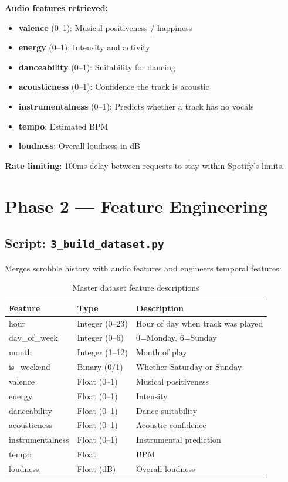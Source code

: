 \documentclass[12pt, a4paper]{article}
\begin{document}
\textbf{Audio features retrieved:}
\begin{itemize}
    \item \textbf{valence} (0--1): Musical positiveness / happiness
    \item \textbf{energy} (0--1): Intensity and activity
    \item \textbf{danceability} (0--1): Suitability for dancing
    \item \textbf{acousticness} (0--1): Confidence the track is acoustic
    \item \textbf{instrumentalness} (0--1): Predicts whether a track has no vocals
    \item \textbf{tempo}: Estimated BPM
    \item \textbf{loudness}: Overall loudness in dB
\end{itemize}

\textbf{Rate limiting}: 100ms delay between requests to stay within Spotify's limits.

\section{Phase 2 — Feature Engineering}

\subsection{Script: \texttt{3\_build\_dataset.py}}

Merges scrobble history with audio features and engineers temporal features:

\begin{table}[H]
\centering
\begin{tabular}{lll}
\toprule
\textbf{Feature} & \textbf{Type} & \textbf{Description} \\
\midrule
hour & Integer (0--23) & Hour of day when track was played \\
day\_of\_week & Integer (0--6) & 0=Monday, 6=Sunday \\
month & Integer (1--12) & Month of play \\
is\_weekend & Binary (0/1) & Whether Saturday or Sunday \\
valence & Float (0--1) & Musical positiveness \\
energy & Float (0--1) & Intensity \\
danceability & Float (0--1) & Dance suitability \\
acousticness & Float (0--1) & Acoustic confidence \\
instrumentalness & Float (0--1) & Instrumental prediction \\
tempo & Float & BPM \\
loudness & Float (dB) & Overall loudness \\
\bottomrule
\end{tabular}
\caption{Master dataset feature descriptions}
\end{table}
\end{document}
